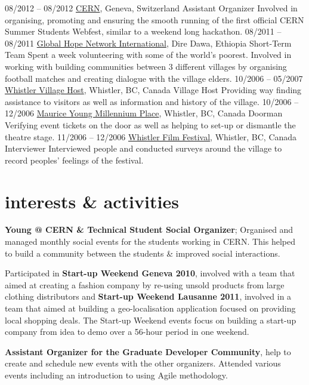 \documentclass[]{friggeri-cv}
\begin{document}
\begin{entrylist}
  \entry
    {08/2012 – 08/2012}
    {\href{http://cern.ch}{CERN}, Geneva, Switzerland}
    {Assistant Organizer}
    {Involved in organising, promoting and ensuring the smooth running of the first official CERN Summer Students Webfest, similar to a weekend long hackathon.}
  \entry
    {08/2011 – 08/2011}
    {\href{http://ghni.org}{Global Hope Network International}, Dire Dawa, Ethiopia}
    {Short-Term Team}
    {Spent a week volunteering with some of the world's poorest. Involved in working with building communities between 3 different villages by organising football matches and creating dialogue with the village elders.}
  \entry
    {10/2006 – 05/2007}
    {\href{http://whistler.ca}{Whistler Village Host}, Whistler, BC, Canada}
    {Village Host}
    {Providing way finding assistance to visitors as well as information and history of the village.}
  \entry
    {10/2006 – 12/2006}
    {\href{http://www.artswhistler.com}{Maurice Young Millennium Place}, Whistler, BC, Canada}
    {Doorman}
    {Verifying event tickets on the door as well as helping to set-up or dismantle the theatre stage.}
  \entry
    {11/2006 – 12/2006}
    {\href{http://whistlerfilmfestival.com}{Whistler Film Festival}, Whistler, BC, Canada}
    {Interviewer}
    {Interviewed people and conducted surveys around the village to record peoples' feelings of the festival.}
\end{entrylist}

\section{interests \& activities}

\textbf{Young @ CERN \& Technical Student Social Organizer}; Organised and managed monthly social events for the students working in CERN. This helped to build a community between the students \& improved social interactions.

Participated in \textbf{Start-up Weekend Geneva 2010}, involved with a team that aimed at creating a fashion company by re-using unsold products from large clothing distributors and \textbf{Start-up Weekend Lausanne 2011}, involved in a team that aimed at building a geo-localisation application focused on providing local shopping deals. The Start-up Weekend events focus on building a start-up company from idea to demo over a 56-hour period in one weekend.

\textbf{Assistant Organizer for the Graduate Developer Community}, help to create and schedule new events with the other organizers. Attended various events including an introduction to using Agile methodology.
\end{document}

